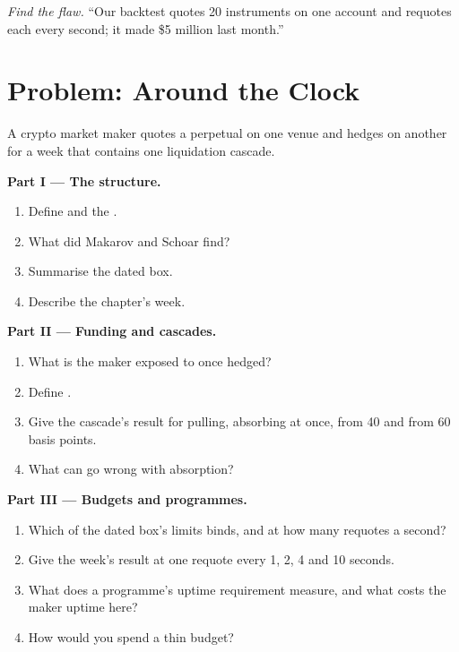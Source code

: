 \begin{exercise}[$\star\star\star$]\label{exo:hf:crypto-high-frequency-trading-on-centralised-venues:8}
\emph{Find the flaw.} ``Our backtest quotes 20 instruments on one account and requotes each every second; it made \$5 million last month.''
\end{exercise}

\section{Problem: Around the Clock}

\begin{problem}\label{pb:hf:crypto-high-frequency-trading-on-centralised-venues:1}
A crypto market maker quotes a perpetual on one venue and hedges on another for a week that contains one liquidation cascade.

\medskip\noindent\textbf{Part I --- The structure.}
\begin{enumerate}
\item Define  and the .
\item What did Makarov and Schoar find?
\item Summarise the dated box.
\item Describe the chapter's week.
\end{enumerate}

\medskip\noindent\textbf{Part II --- Funding and cascades.}
\begin{enumerate}[resume]
\item What is the maker exposed to once hedged?
\item Define .
\item Give the cascade's result for pulling, absorbing at once, from 40 and from 60 basis points.
\item What can go wrong with absorption?
\end{enumerate}

\medskip\noindent\textbf{Part III --- Budgets and programmes.}
\begin{enumerate}[resume]
\item Which of the dated box's limits binds, and at how many requotes a second?
\item Give the week's result at one requote every 1, 2, 4 and 10 seconds.
\item What does a programme's uptime requirement measure, and what costs the maker uptime here?
\item How would you spend a thin budget?
\end{enumerate}


\end{problem}
